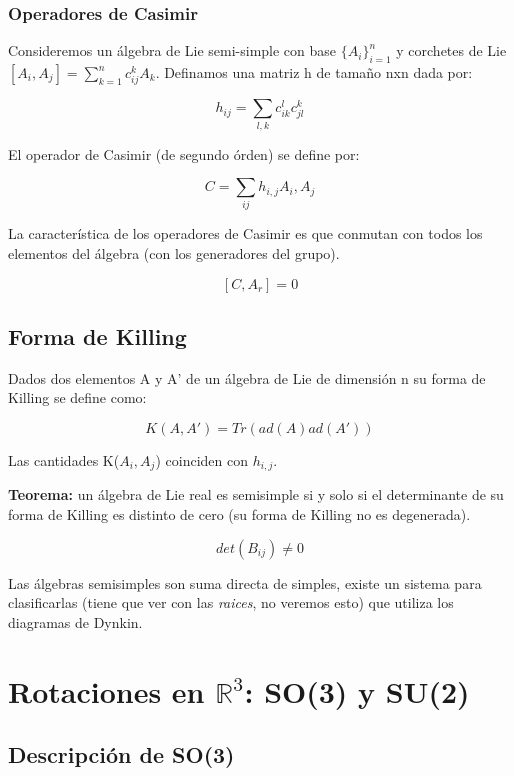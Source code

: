 \documentclass{article}
\begin{document}
\subsubsection{Operadores de Casimir}

Consideremos un álgebra de Lie semi-simple con base $\lbrace A_i \rbrace _{i=1}^n$ y corchetes de Lie $[A_i,A_j]=\sum _{k=1}^n c_{ij}^k A_k$. Definamos una matriz h de tamaño nxn dada por:

$$h_{ij}=\sum _{l,k}c^l_{ik}c^k_{jl}$$

El operador de Casimir (de segundo órden) se define por:

$$C=\sum _{ij}h_{i,j}A_i,A_j$$

La característica de los operadores de Casimir es que conmutan con todos los elementos del álgebra (con los generadores del grupo).

$$[C,A_r]=0$$

\subsection{Forma de Killing}

Dados dos elementos A y A' de un álgebra de Lie de dimensión n su forma de Killing se define como:

$$K(A,A')=Tr(ad(A)ad(A'))$$

Las cantidades K($A_i,A_j$) coinciden con $h_{i,j}$.

\textbf{Teorema:} un álgebra de Lie real es semisimple si y solo si el determinante de su forma de Killing es distinto de cero (su forma de Killing no es degenerada).

$$det(B_{ij})\neq 0$$

Las álgebras semisimples son suma directa de simples, existe un sistema para clasificarlas (tiene que ver con las \textit{raices}, no veremos esto) que utiliza los diagramas de Dynkin.

\newpage

%
%
%
%
%
%
%
%
%
%
%
%
%
%
%
%

\section{Rotaciones en $\mathds{R}^3$: SO(3) y SU(2)}

\subsection{Descripción de SO(3)}
\end{document}
